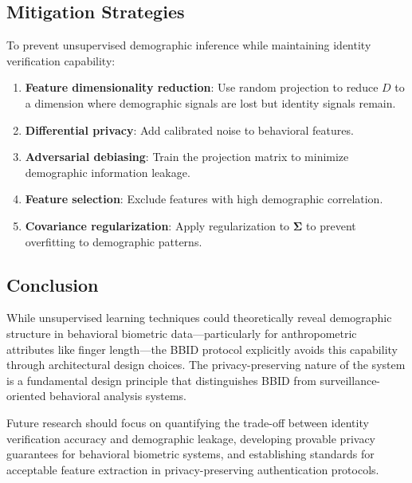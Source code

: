 \documentclass[11pt,twoside]{amsart}
\theoremstyle{plain}
\theoremstyle{definition}
\theoremstyle{remark}
\newcommand{\bSigma}{\boldsymbol{\Sigma}}
\begin{document}
\subsection{Mitigation Strategies}

To prevent unsupervised demographic inference while maintaining identity verification capability:

\begin{enumerate}
    \item \textbf{Feature dimensionality reduction}: Use random projection to reduce $D$ to a dimension where demographic signals are lost but identity signals remain.
    \item \textbf{Differential privacy}: Add calibrated noise to behavioral features.
    \item \textbf{Adversarial debiasing}: Train the projection matrix to minimize demographic information leakage.
    \item \textbf{Feature selection}: Exclude features with high demographic correlation.
    \item \textbf{Covariance regularization}: Apply regularization to $\bSigma$ to prevent overfitting to demographic patterns.
\end{enumerate}

\subsection{Conclusion}

While unsupervised learning techniques could theoretically reveal demographic structure in behavioral biometric data---particularly for anthropometric attributes like finger length---the BBID protocol explicitly avoids this capability through architectural design choices. The privacy-preserving nature of the system is a fundamental design principle that distinguishes BBID from surveillance-oriented behavioral analysis systems.

Future research should focus on quantifying the trade-off between identity verification accuracy and demographic leakage, developing provable privacy guarantees for behavioral biometric systems, and establishing standards for acceptable feature extraction in privacy-preserving authentication protocols.
\end{document}
